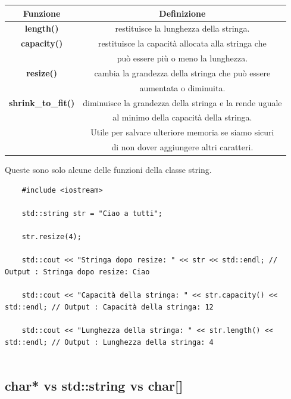 \begin{tabular}{|c|c|}
	\hline
	\textbf{Funzione} & \textbf{Definizione} \\
	\hline
	\textbf{length()} & \textsf{\small restituisce la lunghezza della stringa.} \\
	\hline
	\textbf{capacity()} & \textsf{\small restituisce la capacità allocata alla stringa che } \\
	\textbf{} & \textsf{\small può essere più o meno la lunghezza.} \\
	\hline
	\textbf{resize()} & \textsf{\small cambia la grandezza della stringa che può essere } \\
	\textbf{} & \textsf{\small aumentata o diminuita.} \\
	\hline
	\textbf{shrink\_to\_fit()} & \textsf{\small diminuisce la grandezza della stringa e la rende uguale } \\
	\textbf{} & \textsf{\small al minimo della capacità della stringa.} \\
	\textbf{} & \textsf{\small Utile per salvare ulteriore memoria se siamo sicuri } \\
	\textbf{} & \textsf{\small di non dover aggiungere altri caratteri.} \\
	\hline
\end{tabular} 

\textsf{\small Queste sono solo alcune delle funzioni della classe string.} \\

\begin{lstlisting}
	#include <iostream>
	
	std::string str = "Ciao a tutti";
	
	str.resize(4); 
	
	std::cout << "Stringa dopo resize: " << str << std::endl; // Output : Stringa dopo resize: Ciao
	
	std::cout << "Capacità della stringa: " << str.capacity() << std::endl; // Output : Capacità della stringa: 12
	
	std::cout << "Lunghezza della stringa: " << str.length() << std::endl; // Output : Lunghezza della stringa: 4
	
\end{lstlisting}

\subsection{char* vs std::string vs char[]}

